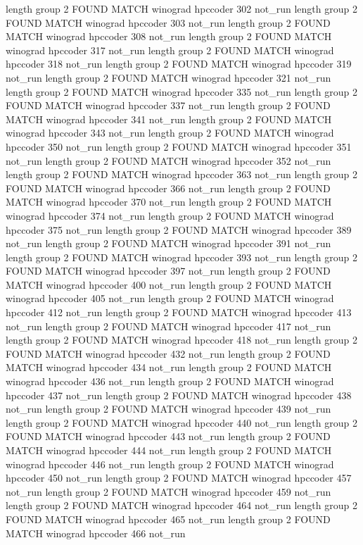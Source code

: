 length group  2
FOUND MATCH winograd hpccoder 302 not_run
length group  2
FOUND MATCH winograd hpccoder 303 not_run
length group  2
FOUND MATCH winograd hpccoder 308 not_run
length group  2
FOUND MATCH winograd hpccoder 317 not_run
length group  2
FOUND MATCH winograd hpccoder 318 not_run
length group  2
FOUND MATCH winograd hpccoder 319 not_run
length group  2
FOUND MATCH winograd hpccoder 321 not_run
length group  2
FOUND MATCH winograd hpccoder 335 not_run
length group  2
FOUND MATCH winograd hpccoder 337 not_run
length group  2
FOUND MATCH winograd hpccoder 341 not_run
length group  2
FOUND MATCH winograd hpccoder 343 not_run
length group  2
FOUND MATCH winograd hpccoder 350 not_run
length group  2
FOUND MATCH winograd hpccoder 351 not_run
length group  2
FOUND MATCH winograd hpccoder 352 not_run
length group  2
FOUND MATCH winograd hpccoder 363 not_run
length group  2
FOUND MATCH winograd hpccoder 366 not_run
length group  2
FOUND MATCH winograd hpccoder 370 not_run
length group  2
FOUND MATCH winograd hpccoder 374 not_run
length group  2
FOUND MATCH winograd hpccoder 375 not_run
length group  2
FOUND MATCH winograd hpccoder 389 not_run
length group  2
FOUND MATCH winograd hpccoder 391 not_run
length group  2
FOUND MATCH winograd hpccoder 393 not_run
length group  2
FOUND MATCH winograd hpccoder 397 not_run
length group  2
FOUND MATCH winograd hpccoder 400 not_run
length group  2
FOUND MATCH winograd hpccoder 405 not_run
length group  2
FOUND MATCH winograd hpccoder 412 not_run
length group  2
FOUND MATCH winograd hpccoder 413 not_run
length group  2
FOUND MATCH winograd hpccoder 417 not_run
length group  2
FOUND MATCH winograd hpccoder 418 not_run
length group  2
FOUND MATCH winograd hpccoder 432 not_run
length group  2
FOUND MATCH winograd hpccoder 434 not_run
length group  2
FOUND MATCH winograd hpccoder 436 not_run
length group  2
FOUND MATCH winograd hpccoder 437 not_run
length group  2
FOUND MATCH winograd hpccoder 438 not_run
length group  2
FOUND MATCH winograd hpccoder 439 not_run
length group  2
FOUND MATCH winograd hpccoder 440 not_run
length group  2
FOUND MATCH winograd hpccoder 443 not_run
length group  2
FOUND MATCH winograd hpccoder 444 not_run
length group  2
FOUND MATCH winograd hpccoder 446 not_run
length group  2
FOUND MATCH winograd hpccoder 450 not_run
length group  2
FOUND MATCH winograd hpccoder 457 not_run
length group  2
FOUND MATCH winograd hpccoder 459 not_run
length group  2
FOUND MATCH winograd hpccoder 464 not_run
length group  2
FOUND MATCH winograd hpccoder 465 not_run
length group  2
FOUND MATCH winograd hpccoder 466 not_run
